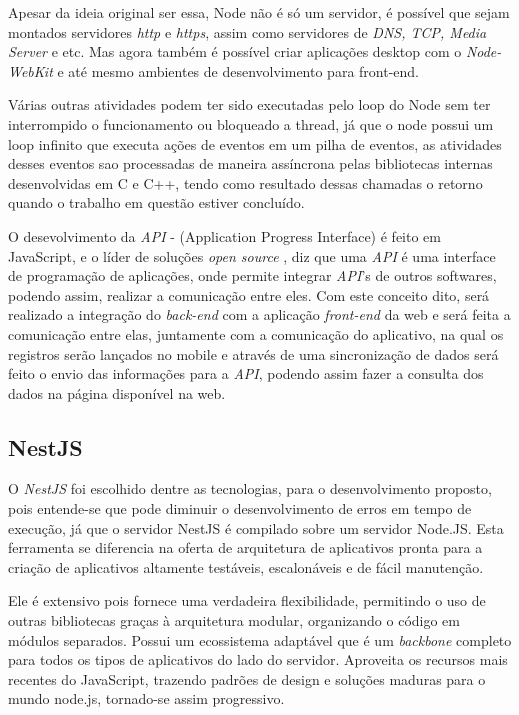 Apesar da ideia original ser essa, Node não é só um servidor, é possível que sejam montados servidores \textit{http} e  \textit{https}, assim como servidores de  \textit{DNS, TCP, Media Server} e etc. Mas agora também é possível criar aplicações desktop com o  \textit{Node-WebKit} e até mesmo ambientes de desenvolvimento para front-end. \cite{node1}


Várias outras atividades podem ter sido executadas pelo loop do Node sem ter interrompido o funcionamento ou bloqueado a thread, já que o node possui um loop infinito que executa ações de eventos em um pilha de eventos, as atividades desses eventos sao processadas de maneira assíncrona pelas bibliotecas internas desenvolvidas em C e C++, tendo como resultado dessas chamadas o retorno quando o trabalho em questão estiver concluído.

O desevolvimento da \textit{API} - (Application Progress Interface) é feito em JavaScript,  e o líder de soluções \textit{open source} , diz que uma \textit{API} é uma interface de programação de aplicações, onde permite integrar \textit{API}'s de outros softwares, podendo assim, realizar a comunicação entre eles. Com este conceito dito, será realizado a integração do \textit{back-end} com a aplicação \textit{front-end} da web e será feita a comunicação entre elas, juntamente com a comunicação do aplicativo, na qual os registros serão lançados no mobile e através de uma sincronização de dados será feito o envio das informações para a \textit{API}, podendo assim fazer a consulta dos dados na página disponível na web.

\subsection{NestJS}
O \textit{NestJS} foi escolhido dentre as tecnologias, para o desenvolvimento proposto, pois entende-se que pode diminuir o desenvolvimento de erros em tempo de execução, já que o servidor NestJS é compilado sobre um servidor Node.JS. Esta ferramenta se diferencia na oferta de arquitetura de aplicativos pronta para a criação de aplicativos altamente testáveis, escalonáveis e de fácil manutenção.

Ele é extensivo pois fornece uma verdadeira flexibilidade, permitindo o uso de outras bibliotecas graças à arquitetura modular, organizando o código em módulos separados. Possui um ecossistema adaptável que é um \textit{backbone} completo para todos os tipos de aplicativos do lado do servidor. Aproveita os recursos mais recentes do JavaScript, trazendo padrões de design e soluções maduras para o mundo node.js, tornado-se assim progressivo. \cite{nest}

